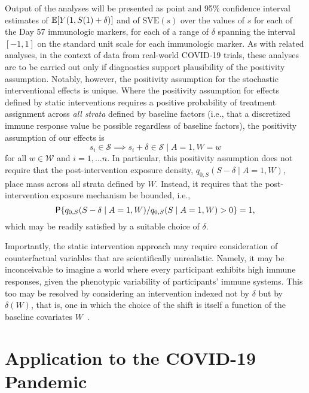 Output of the analyses will be presented as point and 95\% confidence interval
estimates of $\E[Y(1, S(1) + \delta)]$ and of $\text{SVE}(s)$ over the values of
$s$ for each of the Day 57 immunologic markers, for each of a range of $\delta$
spanning the interval $[-1, 1]$ on the standard unit scale for each immunologic
marker. As with related analyses, in the context of data from real-world
COVID-19 trials, these analyses are to be carried out only if diagnostics
support plausibility of the positivity assumption. Notably, however, the
positivity assumption for the stochastic interventional effects is unique. Where
the positivity assumption for effects defined by static interventions requires
a positive probability of treatment assignment across \textit{all strata}
defined by baseline factors (i.e., that a discretized immune response value be
possible regardless of baseline factors), the positivity assumption of our
effects is
\begin{equation*}
  s_i \in \mathcal{S} \implies s_i + \delta \in \mathcal{S} \mid A = 1, W = w
\end{equation*}
\noindent for all $w \in \mathcal{W}$ and $i = 1, \ldots n$. In particular, this
positivity assumption does not require that the post-intervention exposure
density, $q_{0,S}(S - \delta \mid A = 1, W)$, place mass across all strata
defined by $W$. Instead, it requires that the post-intervention exposure
mechanism be bounded, i.e.,
\begin{equation*}
  \P \{q_{0,S}(S - \delta \mid A = 1, W) / q_{0,S}(S \mid A = 1, W) > 0 \} = 1,
\end{equation*}
\noindent which may be readily satisfied by a suitable choice of $\delta$.

Importantly, the static intervention approach may require consideration of
counterfactual variables that are scientifically unrealistic. Namely, it may be
inconceivable to imagine a world where every participant exhibits high immune
responses, given the phenotypic variability of participants' immune systems.
This too may be resolved by considering an intervention indexed not by $\delta$
but by $\delta(W)$, that is, one in which the choice of the shift is itself
a function of the baseline covariates $W$~\citep{hejazi2020efficient,
diaz2012population, haneuse2013estimation, diaz2018stochastic}.

\section{Application to the COVID-19 Pandemic}

